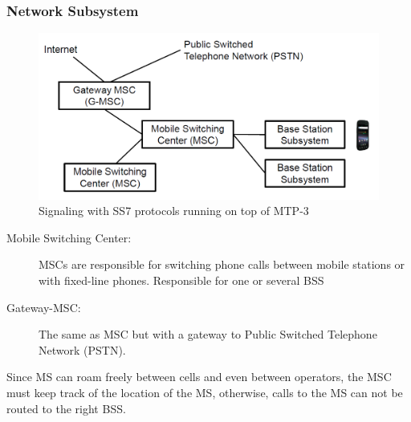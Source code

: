 \subsubsection{Network Subsystem}
\begin{figure}[ht!]
    \centering
    \includegraphics[width=0.7\linewidth]{img/nss.png}
    \caption{Signaling with SS7 protocols running on top of MTP-3}
\end{figure}

\begin{description}
    \item[Mobile Switching Center:] MSCs are responsible for switching phone
        calls between mobile stations or with fixed-line phones. Responsible for
        one or several BSS
    \item [Gateway-MSC:] The same as MSC but with a gateway to Public Switched
        Telephone Network (PSTN).
\end{description}

Since MS can roam freely between cells and even between operators, the MSC
must keep track of the location of the MS, otherwise, calls to the MS can not be
routed to the right BSS.

